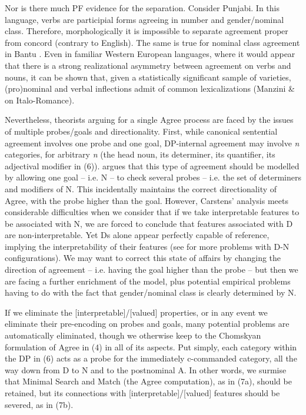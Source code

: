 \documentclass[output=paper]{langsci/langscibook}
\begin{document}
Nor is there much PF evidence for the separation. Consider Punjabi. In this language, verbs are participial forms agreeing in number and gender/nominal class. Therefore, morphologically it is impossible to separate agreement proper from concord (contrary to English). The same is true for nominal class agreement in Bantu \citep{Baker2008}. Even in familiar Western European languages, where it would appear that there is a strong realizational asymmetry between agreement on verbs and nouns, it can be shown that, given a statistically significant sample of varieties, (pro)nominal and verbal inflections admit of common lexicalizations (Manzini \& \citealt{Savoia2007} on Italo-Romance).

Nevertheless, theorists arguing for a single Agree process are faced by the issues of multiple probes/goals and directionality. First, while canonical sentential agreement involves one probe and one goal, DP-internal agreement may involve \textit{n} categories, for arbitrary \textit{n} (the head noun, its determiner, its quantifier, its adjectival modifier in (6)). \citet{Carstens2001} argues that this type of agreement should be modelled by allowing one goal – i.e. N – to check several probes – i.e. the set of determiners and modifiers of N. This incidentally maintains the correct directionality of Agree, with the probe higher than the goal. However, Carstens’ analysis meets considerable difficulties when we consider that if we take interpretable features to be associated with N, we are forced to conclude that features associated with D are non-interpretable. Yet Ds alone appear perfectly capable of reference, implying the interpretability of their features (see \citealt{Danon2010} for more problems with D-N configurations). We may want to correct this state of affairs by changing the direction of agreement – i.e. having the goal higher than the probe – but then we are facing a further enrichment of the model, plus potential empirical problems having to do with the fact that gender/nominal class is clearly determined by N.

If we eliminate the [interpretable]/[valued] properties, or in any event we eliminate their pre-encoding on probes and goals, many potential problems are automatically eliminated, though we otherwise keep to the Chomskyan formulation of Agree in (4) in all of its aspects. Put simply, each category within the DP in (6) acts as a probe for the immediately c-commanded category, all the way down from D to N and to the postnominal A. In other words, we surmise that Minimal Search and Match (the Agree computation), as in (7a), should be retained, but its connections with [interpretable]/[valued] features should be severed, as in (7b). 
\end{document}
